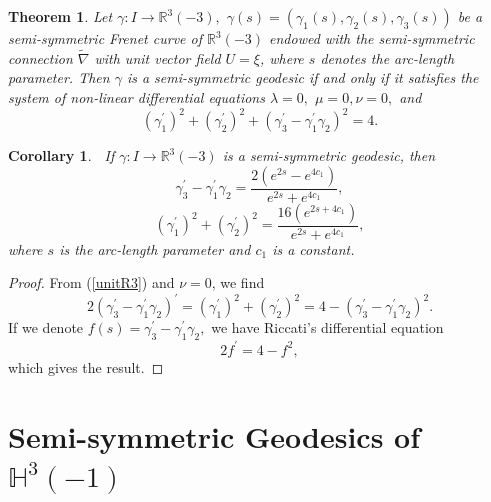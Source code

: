 \documentclass{amsart}
\theoremstyle{plain}
\newtheorem{theorem}{Theorem}
\newtheorem{corollary}{Corollary}
\theoremstyle{definition}
\theoremstyle{remark}
\numberwithin{equation}{section}
\begin{document}
\begin{theorem}
Let $\gamma :I\rightarrow \mathbb{R}^{3}(-3),$ $\gamma (s)=\left( \gamma
_{1}(s),\gamma _{2}(s),\gamma _{3}(s)\right) $ be a semi-symmetric Frenet
curve of $\mathbb{R}^{3}(-3)$ endowed with the semi-symmetric connection $%
\widetilde{\nabla }$ with unit vector field $U=\xi $, where $s$ denotes the
arc-length parameter. Then $\gamma $ is a semi-symmetric geodesic if and
only if it satisfies the system of non-linear differential equations $%
\lambda =0,$ $\mu =0,\nu =0,$ and 
\begin{equation*}
\left( \gamma _{1}^{\prime }\right) ^{2}+\left( \gamma _{2}^{\prime }\right)
^{2}+\left( \gamma _{3}^{\prime }-\gamma _{1}^{\prime }\gamma _{2}\right)
^{2}=4.
\end{equation*}
\end{theorem}

\begin{corollary}
\textbf{\ }If $\gamma :I\rightarrow \mathbb{R}^{3}(-3)$ is a semi-symmetric
geodesic, then%
\begin{equation*}
\gamma _{3}^{\prime }-\gamma _{1}^{\prime }\gamma _{2}=\frac{2\left(
e^{2s}-e^{4c_{1}}\right) }{e^{2s}+e^{4c_{1}}},
\end{equation*}%
\begin{equation*}
\left( \gamma _{1}^{\prime }\right) ^{2}+\left( \gamma _{2}^{\prime }\right)
^{2}=\frac{16\left( e^{2s+4c_{1}}\right) }{e^{2s}+e^{4c_{1}}},
\end{equation*}%
where $s$ is the arc-length parameter and $c_{1}$ is a constant.
\end{corollary}

\begin{proof}
From (\ref{unitR3}) and $\nu =0$, we find%
\begin{equation*}
2\left( \gamma _{3}^{\prime }-\gamma _{1}^{\prime }\gamma _{2}\right)
^{\prime }=\left( \gamma _{1}^{\prime }\right) ^{2}+\left( \gamma
_{2}^{\prime }\right) ^{2}=4-\left( \gamma _{3}^{\prime }-\gamma
_{1}^{\prime }\gamma _{2}\right) ^{2}.
\end{equation*}%
If we denote $f(s)=\gamma _{3}^{\prime }-\gamma _{1}^{\prime }\gamma _{2},$
we have Riccati's differential equation%
\begin{equation*}
2f^{\prime }=4-f^{2},
\end{equation*}%
which gives the result.
\end{proof}

\section{\label{sect-geodesic-H3(-1)}Semi-symmetric Geodesics of $\mathbb{H}%
^{3}(-1)$}
\end{document}

